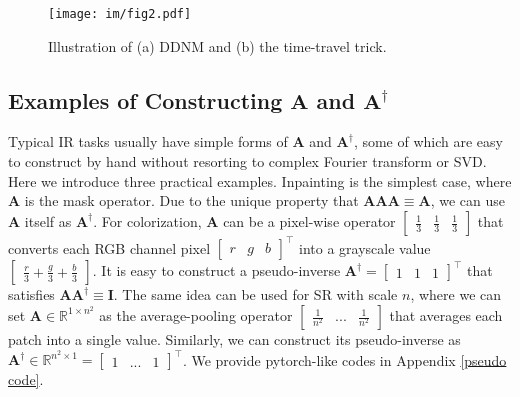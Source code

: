 \documentclass{article} \usepackage{iclr2023_conference,times}
\begin{document}
\begin{figure*}[t]
  \centering
  \texttt{[image: im/fig2.pdf]}
  \vspace{-0.5cm}
  \caption{Illustration of (a) DDNM and (b) the time-travel trick.}
  \vspace{-0.5cm}
\label{fig:ddcm} 
\end{figure*}

\subsection{Examples of Constructing $\mathbf{A}$ and $\mathbf{A}^{\dagger}$}
\label{cp:construct A}
Typical IR tasks usually have simple forms of $\mathbf{A}$ and $\mathbf{A}^{\dagger}$, 
some of which are easy to construct by hand without resorting to complex Fourier transform or SVD. Here we introduce three practical examples. Inpainting is the simplest case, where $\mathbf{A}$ is the mask operator. Due to the unique property that $\mathbf{A}\mathbf{A}\mathbf{A}\equiv\mathbf{A}$, we can use $\mathbf{A}$ itself as $\mathbf{A}^{\dagger}$. For colorization, $\mathbf{A}$ can be a pixel-wise operator $\begin{bmatrix}\frac{1}{3} & \frac{1}{3} & \frac{1}{3}\end{bmatrix}$ that converts each RGB channel pixel $\begin{bmatrix}r & g & b\end{bmatrix}^{\top}$ into a grayscale value $\begin{bmatrix}\frac{r}{3} + \frac{g}{3} +\frac{b}{3}\end{bmatrix}$. It is easy to construct a pseudo-inverse $\mathbf{A}^{\dagger}=\begin{bmatrix}1 & 1 & 1\end{bmatrix}^{\top}$ that satisfies $\mathbf{A}\mathbf{A}^{\dagger}\equiv\mathbf{I}$. The same idea can be used for SR with scale $n$, where we can set $\mathbf{A}\in\mathbb{R}^{1\times n^2}$ as the average-pooling operator $\begin{bmatrix}\frac{1}{n^{2}} & ... & \frac{1}{n^{2}}\end{bmatrix}$ that averages each patch into a single value. Similarly, we can construct its pseudo-inverse as $\mathbf{A}^{\dagger}\in\mathbb{R}^{n^2\times 1}=\begin{bmatrix}1 & ... & 1\end{bmatrix}^{\top}$. We provide pytorch-like codes in Appendix \ref{pseudo code}. 
\end{document}

